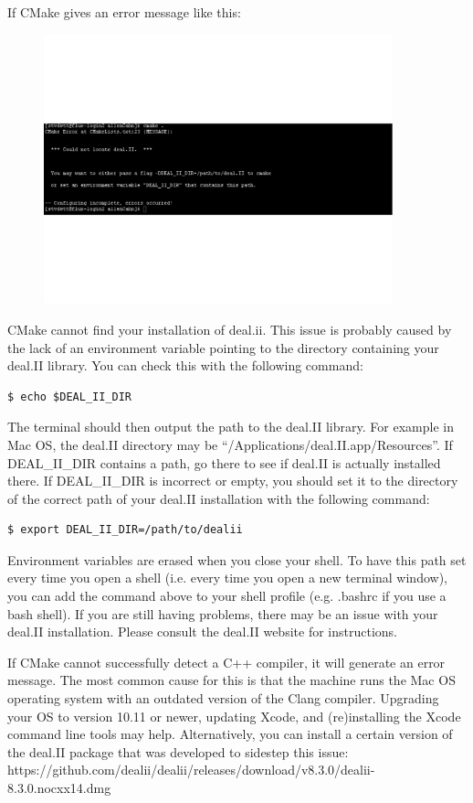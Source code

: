 \documentclass[10pt]{article} %
\begin{document}
If CMake gives an error message like this:
\begin{figure}[H]
\vspace{-90pt}
\centering
\includegraphics[width=0.9\textwidth,trim={0 0 8cm 0},clip]{cmake_no_dealii}
\vspace{-90pt}
\end{figure}
CMake cannot find your installation of deal.ii. This issue is probably caused by the lack of an environment variable pointing to the directory containing your deal.II library. You can check this with the following command:
\begin{lstlisting}
$ echo $DEAL_II_DIR
\end{lstlisting}
The terminal should then output the path to the deal.II library. For example in Mac OS, the deal.II directory may be ``/Applications/deal.II.app/Resources''. If  DEAL\_II\_DIR contains a path, go there to see if deal.II is actually installed there. If DEAL\_II\_DIR is incorrect or empty, you should set it to the directory of the correct path of your deal.II installation with the following command:
\begin{lstlisting}
$ export DEAL_II_DIR=/path/to/dealii
\end{lstlisting}
Environment variables are erased when you close your shell. To have this path set every time you open a shell (i.e. every time you open a new terminal window), you can add the command above to your shell profile (e.g. .bashrc if you use a bash shell). If you are still having problems, there may be an issue with your deal.II installation. Please consult the deal.II website for instructions.

If CMake cannot successfully detect a C++ compiler, it will generate an error message. The most common cause for this is that the machine runs the Mac OS operating system with an outdated version of the Clang compiler. Upgrading your OS to version 10.11 or newer, updating Xcode, and (re)installing the Xcode command line tools may help. Alternatively, you can install a certain version of the deal.II package that was developed to sidestep this issue:
\\https://github.com/dealii/dealii/releases/download/v8.3.0/dealii-8.3.0.nocxx14.dmg\\
\end{document}
